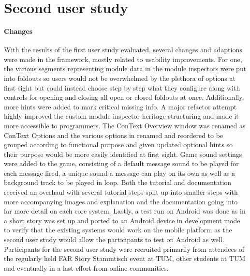 \section{Second user study}
\paragraph{Changes} With the results of the first user study evaluated, several changes and adaptions were made in the framework, mostly related to usability improvements. For one, the various segments representing module data in the module inspectors were put into foldouts so users would not be overwhelmed by the plethora of options at first sight but could instead choose step by step what they configure along with controls for opening and closing all open or closed foldouts at once. Additionally, more hints were added to mark critical missing info. A major refactor attempt highly improved the custom module inspector heritage structuring and made it more accessible to programmers. 
The ConText Overview window was renamed as ConText Options and the various options in renamed and reordered to be grouped according to functional purpose and given updated optional hints so their purpose would be more easily identified at first sight. 
Game sound settings were added to the game, consisting of a default message sound to be played for each message fired, a unique sound a message can play on its own as well as a background track to be played in loop. 
Both the tutorial and documentation received an overhaul with several tutorial steps split up into smaller steps with more accompanying images and explanation and the documentation going into far more detail on each core system. 
Lastly, a test run on Android was done as in a short story was set up and ported to an Android device in development mode to verify that the existing systems would work on the mobile platform as the second user study would allow the participants to test on Android as well. 
Participants for the second user study were recruited primarily from attendees of the regularly held FAR Story Stammtisch event at TUM, other students at TUM and eventually in a last effort from online communities.

